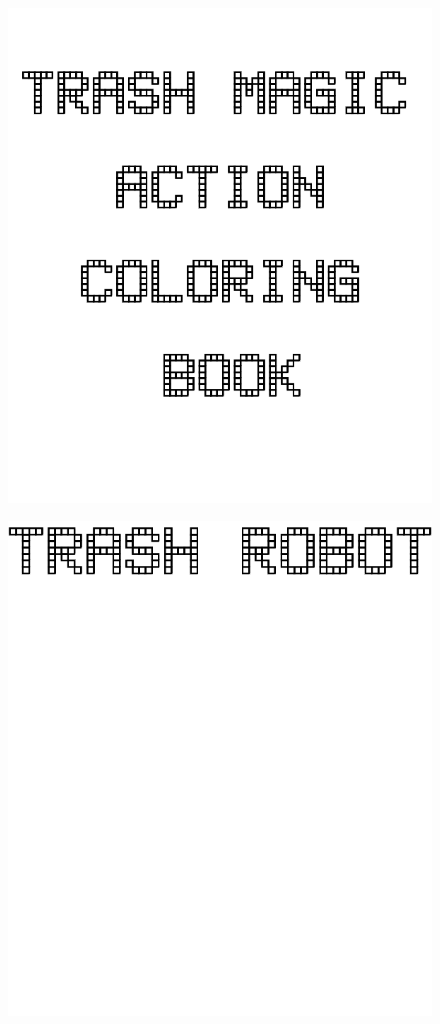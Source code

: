 \documentclass[17pt]{extreport}
\begin{document}
	

        \begin{figure}
		\centering
		\includegraphics[width=8.0in]{imageserver/uploadimages/cover.png}
	\end{figure}	
        \begin{figure}
		\centering
		\includegraphics[width=7.5in]{imageserver/uploadimages/trashrobot.png}
	\end{figure}	
\end{document}
